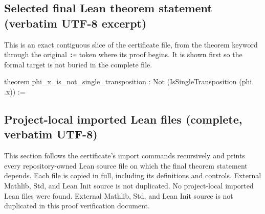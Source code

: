 \documentclass[11pt]{article}
\begin{document}
\subsection*{Selected final Lean theorem statement (verbatim UTF-8 excerpt)}
This is an exact contiguous slice of the certificate file, from the theorem keyword through the original \texttt{:=} token where its proof begins. It is shown first so the formal target is not buried in the complete file.
\begin{Vlean}
theorem phi_x_is_not_single_transposition :
    Not (IsSingleTransposition (phi .x)) :=
\end{Vlean}
\subsection*{Project-local imported Lean files (complete, verbatim UTF-8)}
This section follows the certificate's import commands recursively and prints every repository-owned Lean source file on which the final theorem statement depends. Each file is copied in full, including its definitions and controls. External Mathlib, Std, and Lean Init source is not duplicated.
No project-local imported Lean files were found. External Mathlib, Std, and Lean Init source is not duplicated in this proof verification document.
\end{document}
